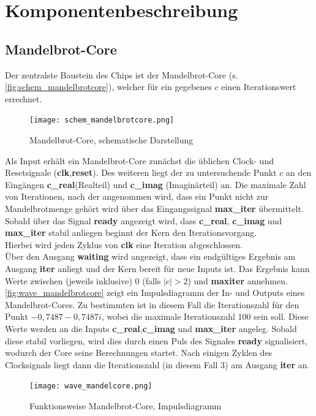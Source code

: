 \documentclass[a4paper,12pt,onesided]{report}
\begin{document}
\section{Komponentenbeschreibung}
\subsection{Mandelbrot-Core}
Der zentralste Baustein des Chips ist der Mandelbrot-Core (s. \autoref{fig:schem_mandelbrotcore}), welcher für ein gegebenes $c$ einen Iterationswert errechnet.
\begin{figure}[H]
	\centering
	\texttt{[image: schem\_mandelbrotcore.png]}
	\caption{Mandelbrot-Core, schematische Darstellung}
	\label{fig:schem_mandelbrotcore}
\end{figure}
Als Input erhält ein Mandelbrot-Core zunächst die üblichen Clock- und Resetsignale (\textbf{clk},\textbf{reset}).
Des weiteren liegt der zu untersuchende Punkt $c$ an den Eingängen \textbf{c\_real}(Realteil) und \textbf{c\_imag} (Imaginärteil) an.
Die maximale Zahl von Iterationen, nach der angenommen wird, dass ein Punkt nicht zur Mandelbrotmenge gehört wird über das Eingangssignal \textbf{max\_iter} übermittelt.\\
Sobald über das Signal \textbf{ready} angezeigt wird, dass \textbf{c\_real}, \textbf{c\_imag} und \textbf{max\_iter} stabil anliegen beginnt der Kern den Iterationsvorgang.\\
Hierbei wird jeden Zyklus von \textbf{clk} eine Iteration abgeschlossen.\\
Über den Ausgang \textbf{waiting} wird angezeigt, dass ein endgültiges Ergebnis am Ausgang \textbf{iter} anliegt und der Kern bereit für neue Inputs ist.
Das Ergebnis kann Werte zwischen (jeweils inklusive) 0 (falls $|c|>2$) und \textbf{maxiter} annehmen.\\
\autoref{fig:wave_mandelbrotcore} zeigt ein Impulsdiagramm der In- und Outputs eines Mandelbrot-Cores.
Zu bestimmten ist in diesem Fall die Iterationszahl für den Punkt $-0,7487-0,7487i$, wobei die maximale Iterationszahl 100 sein soll.
Diese Werte werden an die Inputs \textbf{c\_real},\textbf{c\_imag} und \textbf{max\_iter} angeleg.
Sobald diese stabil vorliegen, wird dies durch einen Puls des Signales \textbf{ready} signalisiert, wodurch der Core seine Berechnungen startet.
Nach einigen Zyklen des Clocksignals liegt dann die Iterationszahl (in diesem Fall 3) am Ausgang \textbf{iter} an.
\begin{figure}[H]
	\centering
	\texttt{[image: wave\_mandelcore.png]}
	\caption{Funktionsweise Mandelbrot-Core, Impulsdiagramm}
	\label{fig:wave_mandelbrotcore}
\end{figure}
\end{document}
